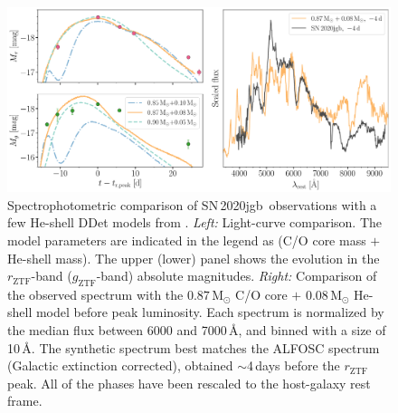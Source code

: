 \documentclass[twocolumn]{aastex631}
\newcommand{\sn}{SN\,2020jgb}
\begin{document}
\begin{CJK*}{UTF8}{gbsn}
\begin{figure}
    \centering
    \includegraphics[width=\textwidth]{model.pdf}
    \caption{Spectrophotometric comparison of \sn\ observations with a few He-shell DDet models from \citet{polin_observational_2019}. {\it Left:} Light-curve comparison. The model parameters are indicated in the legend as (C/O core mass $+$ He-shell mass). The upper (lower) panel shows the evolution in the $r_\mathrm{ZTF}$-band ($g_\mathrm{ZTF}$-band) absolute magnitudes. {\it Right:} Comparison of the observed spectrum with the $0.87\,\mathrm{M_\odot}$ C/O core $+$ $0.08\,\mathrm{M_\odot}$ He-shell model before peak luminosity. Each spectrum is normalized by the median flux between 6000 and 7000\,\AA, and binned with a size of 10\,\AA. The synthetic spectrum best matches the ALFOSC spectrum (Galactic extinction corrected), obtained $\sim$4\,days before the $r_\mathrm{ZTF}$ peak. All of the phases have been rescaled to the host-galaxy rest frame.}
    \label{fig:model}
\end{figure}


\end{CJK*}
\end{document}
